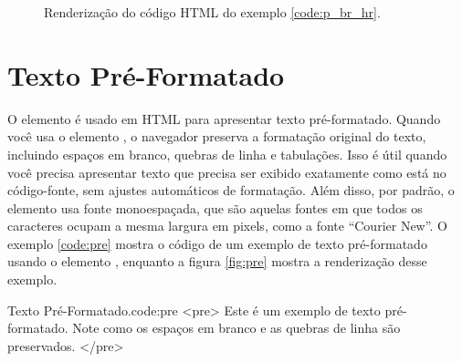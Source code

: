 \begin{figure}[ht!]
    \centering
    \caption{Renderização do código HTML do exemplo \ref{code:p_br_hr}.}
    \label{fig:p_br_hr}
\end{figure}

\section{Texto Pré-Formatado}

O elemento  é usado em HTML para apresentar texto pré-formatado. Quando você usa o elemento , o navegador preserva a formatação original do texto, incluindo espaços em branco, quebras de linha e tabulações. Isso é útil quando você precisa apresentar texto que precisa ser exibido exatamente como está no código-fonte, sem ajustes automáticos de formatação. Além disso, por padrão, o elemento  usa fonte monoespaçada, que são aquelas fontes em que todos os caracteres ocupam a mesma largura em pixels, como a fonte ``Courier New''. O exemplo \ref{code:pre} mostra o código de um exemplo de texto pré-formatado usando o elemento , enquanto a figura \ref{fig:pre} mostra a renderização desse exemplo.

\begin{htmlcode}{Texto Pré-Formatado.}{code:pre}
<pre>
Este é um exemplo de texto
   pré-formatado. Note como
   os espaços em branco e as
   quebras de linha são preservados.
</pre>
\end{htmlcode}

